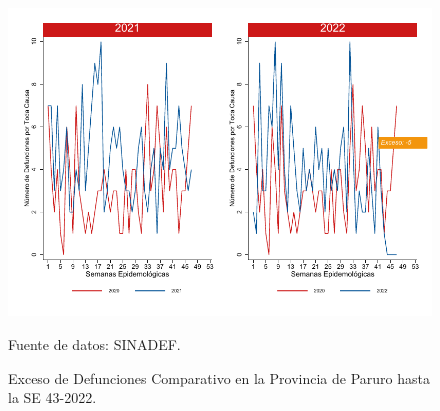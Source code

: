 \documentclass[12pt,a4paper,openany]{book}
\begin{document}
	\begin{figure}[h]
		\caption{Exceso de Defunciones Comparativo en la Provincia de Paruro hasta la SE 43-2022.}\label{fig:exceso_paruro}
		\begin{center}
			\includegraphics[width=0.7\linewidth]{../figuras/exceso_10.pdf}
		\end{center}
		{\footnotesize {Fuente de datos: SINADEF.}}
	\end{figure}
	
	
	\clearpage
	
\end{document}
